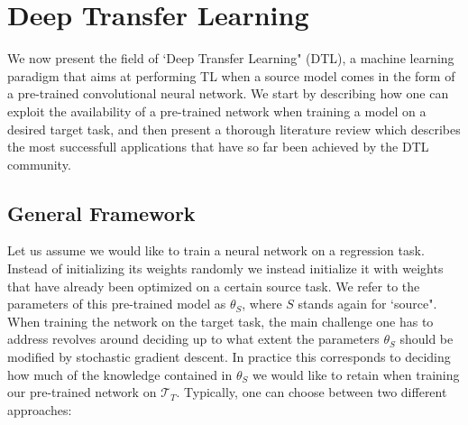 \section{Deep Transfer Learning}
\label{sec:literature_review}

We now present the field of `Deep Transfer Learning" (DTL), a machine learning paradigm that aims at performing TL when a source model comes in the form of a pre-trained convolutional neural network. We start by describing how one can exploit the availability of a pre-trained network when training a model on a desired target task, and then present a thorough literature review which describes the most successfull applications that have so far been achieved by the DTL community.

\subsection{General Framework}
\label{sec:tl_general_framework}

Let us assume we would like to train a neural network on a regression task. Instead of initializing its weights randomly we instead initialize it with weights that have already been optimized on a certain source task. We refer to the parameters of this pre-trained model as $\theta_S$, where $S$ stands again for `source". When training the network on the target task, the main challenge one has to address revolves around deciding up to what extent the parameters $\theta_S$ should be modified by stochastic gradient descent. In practice this corresponds to deciding how much of the knowledge contained in $\theta_S$ we would like to retain when training our pre-trained network on $\mathcal{T}_T$. Typically, one can choose between two different approaches:  

